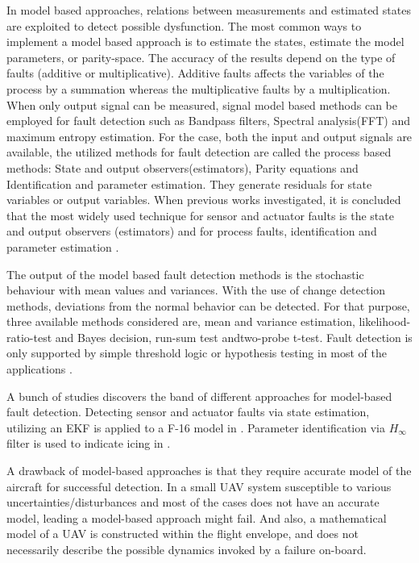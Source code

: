 In model based approaches, relations between measurements and estimated 
states are exploited to detect possible dysfunction. The most common ways to 
implement a model based approach is to estimate the states, estimate the model 
parameters, or parity-space. The accuracy of the results depend on the type of 
faults (additive or multiplicative). Additive faults affects the variables of the process 
by a summation whereas the multiplicative faults by a multiplication.  When only 
output signal can be measured, signal model based methods can be employed for 
fault detection such as Bandpass filters, Spectral analysis(FFT) and maximum entropy estimation. 
For the case, both the input and output signals are available, the utilized methods 
for fault detection are called the process based methods: State and output 
observers(estimators), Parity equations and Identification and parameter estimation. 
They generate residuals for state variables or output variables. When previous works 
investigated, it is concluded that the most widely used technique for sensor and actuator 
faults is the state and output observers (estimators) and for process faults, identification 
and parameter estimation \cite{isermann1997trends}.

The output of the model based fault detection methods is the stochastic behaviour 
with mean values and variances. With the use of change detection methods, deviations 
from the normal behavior can be detected. For that purpose, three available methods 
considered are, mean and variance estimation, likelihood-ratio-test and Bayes decision, 
run-sum test andtwo-probe t-test. Fault detection is only supported by simple threshold 
logic or hypothesis testing in most of the applications \cite{isermann1997trends}.

A bunch of studies discovers the band of different approaches for model-based fault detection. 
Detecting sensor and actuator faults via state estimation, utilizing an EKF is applied to a 
F-16 model in \cite{hajiyev2005sensor}. Parameter identification via $H_{\infty}$ filter 
is used to indicate icing in \cite{melody2001h}.

A drawback of model-based approaches is that they require accurate model of the 
aircraft for successful detection. In a small UAV system susceptible to various 
uncertainties/disturbances and most of the cases does not have an accurate model, 
leading a model-based approach might fail. And also, a mathematical model of a UAV 
is constructed within the flight envelope, and does not necessarily describe the 
possible dynamics invoked by a failure on-board.

